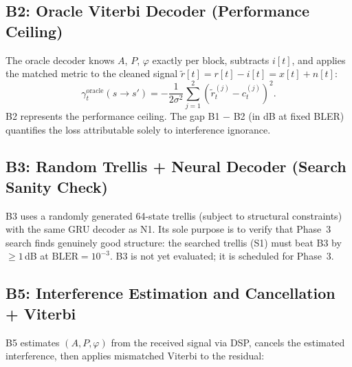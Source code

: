 \documentclass[11pt,a4paper]{article}
\newcommand{\bler}{\text{BLER}}
\begin{document}
\subsection{B2: Oracle Viterbi Decoder (Performance Ceiling)}

The oracle decoder knows $A$, $P$, $\varphi$ exactly per block, subtracts $i[t]$, and applies the matched metric to the cleaned signal $\tilde{r}[t] = r[t] - i[t] = x[t] + n[t]$:
\begin{equation}
  \gamma_t^{\text{oracle}}(s \to s')
  = -\frac{1}{2\sigma^2}\sum_{j=1}^{2}\!\left(\tilde{r}_t^{(j)} - c_t^{(j)}\right)^2.
\end{equation}
B2 represents the performance ceiling. The gap B1 $-$ B2 (in dB at fixed BLER) quantifies the loss attributable solely to interference ignorance.

\subsection{B3: Random Trellis + Neural Decoder (Search Sanity Check)}

B3 uses a randomly generated 64-state trellis (subject to structural constraints) with the same GRU decoder as N1. Its sole purpose is to verify that Phase~3 search finds genuinely good structure: the searched trellis (S1) must beat B3 by $\geq 1$\,dB at $\bler = 10^{-3}$. B3 is not yet evaluated; it is scheduled for Phase~3.

\subsection{B5: Interference Estimation and Cancellation + Viterbi}

B5 estimates $(A, P, \varphi)$ from the received signal via DSP, cancels the estimated interference, then applies mismatched Viterbi to the residual:
\end{document}
